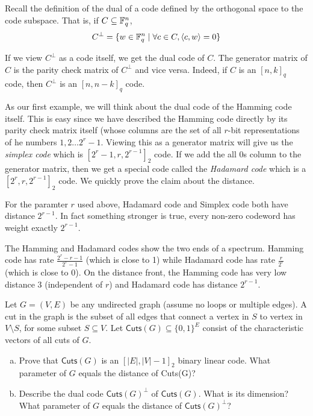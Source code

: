 Recall the definition of the dual of a code defined by the orthogonal space to the code subspace. That is, if $C \subseteq {\mathbb{F}}_q^n$,
$$C^{\perp} = \{ w \in {\mathbb{F}}_q^n \mid \forall c \in C, \langle c,w \rangle = 0 \}$$

If we view $C^\perp$ as a code itself, we get the dual code of $C$. The generator matrix of $C$ is the parity check matrix of $C^\perp$ and vice versa. Indeed, if $C$ is an $[n,k]_q$ code, then $C^\perp$ is an $[n,n-k]_q$ code. 

As our first example, we will think about the dual code of the Hamming code itself. This is easy since we have described the Hamming code directly by its parity check matrix itself (whose columns are the set of all $r$-bit representations of he numbers $1,2 \ldots 2^r-1$. Viewing this as a generator matrix will give us the \textit{simplex code} which is $[2^r-1,r,2^{r-1}]_2$ code. If we add the all $0$s column to the generator matrix, then we get a special code called the \textit{Hadamard code} which is a $[2^r,r,2^{r-1}]_2$ code. We quickly prove the claim about the distance.

\begin{exercise}
For the paramter $r$ used above, Hadamard code and Simplex code both have distance $2^{r-1}$. In fact something stronger is true, every non-zero codeword has weight exactly $2^{r-1}$.
\end{exercise}

The Hamming and Hadamard codes show the two ends of a spectrum. Hamming code has rate $\frac{2^r-r-1}{2^r-1}$ (which is close to 1) while Hadamard code has rate $\frac{r}{2^r}$ (which is close to $0$). On the distance front, the Hamming code has very low distance $3$ (independent of $r$) and Hadamard code has distance $2^{r-1}$.

\begin{exercise}
Let $G=(V,E)$ be any undirected graph (assume no loops or multiple edges). A cut in the graph is the subset of all edges that connect a vertex in $S$ to vertex in $V \setminus S$, for some subset $S \subseteq V$. Let $\mathsf{Cuts}(G) \subseteq \{0,1\}^E$ consist of the characteristic vectors of all cuts of $G$.
\begin{enumerate}[(a)]
\item Prove that $\mathsf{Cuts}(G)$ is an $[|E|,|V|-1]_2$ binary linear code. What parameter of $G$ equals the distance of Cuts(G)?
\item Describe the dual code $\mathsf{Cuts}(G)^\perp$ of $\mathsf{Cuts}(G)$. What is its dimension? What parameter of $G$
equals the distance of $\mathsf{Cuts}(G)^\perp$?
\end{enumerate}
\end{exercise}

